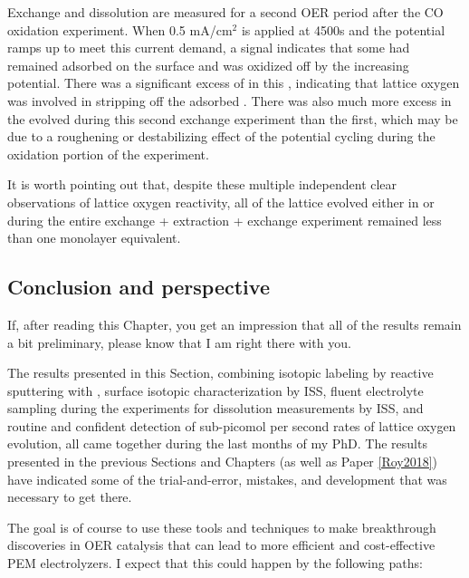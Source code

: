 Exchange and dissolution are measured for a second OER period after the CO oxidation experiment. When 0.5 mA/cm$^2$ is applied at 4500s and the potential ramps up to meet this current demand, a  signal indicates that some  had remained adsorbed on the surface and was oxidized off by the increasing potential. There was a significant excess of  in this , indicating that lattice oxygen was involved in stripping off the adsorbed . There was also much more excess  in the  evolved during this second exchange experiment than the first, which may be due to a roughening or destabilizing effect of the potential cycling during the  oxidation portion of the experiment. 

It is worth pointing out that, despite these multiple independent clear observations of lattice oxygen reactivity, all of the lattice   evolved either in  or  during the entire exchange + extraction + exchange experiment remained less than one monolayer equivalent.


\subsection{Conclusion and perspective}

If, after reading this Chapter, you get an impression that all of the results remain a bit preliminary, please know that I am right there with you. 

The results presented in this Section, combining isotopic labeling by reactive sputtering with , surface isotopic characterization by ISS, fluent electrolyte sampling during the experiments for dissolution measurements by ISS, and routine and confident detection of sub-picomol per second rates of lattice oxygen evolution, all came together during the last months of my PhD. The results presented in the previous Sections and Chapters (as well as Paper \ref{Roy2018}) have indicated some of the trial-and-error, mistakes, and development that was necessary to get there.

The goal is of course to use these tools and techniques to make breakthrough discoveries in OER catalysis that can lead to more efficient and cost-effective PEM electrolyzers. I expect that this could happen by the following paths:

